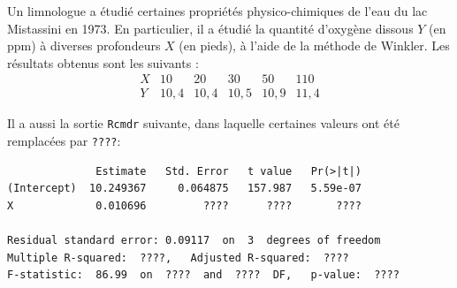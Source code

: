 \begin{questions}
\newpage 
\question 
Un limnologue a étudié certaines propriétés physico-chimiques de l'eau du lac Mistassini en 1973. En particulier, il a étudié la quantité d'oxygène dissous $Y$ (en ppm) à diverses profondeurs $X$ (en pieds), à l'aide de la méthode de Winkler. Les résultats obtenus sont les suivants :
$$
\begin{array}{c|ccccc}
X & 10 & 20 & 30 & 50 & 110   \\  \hline
Y & 10,4 & 10,4 & 10,5 & 10,9 & 11,4
\end{array}
$$

Il a aussi la sortie \texttt{Rcmdr} suivante, dans laquelle certaines valeurs ont été remplacées par \texttt{????}:
\begin{verbatim}
              Estimate   Std. Error   t value   Pr(>|t|)    
(Intercept)  10.249367     0.064875   157.987   5.59e-07 
X             0.010696         ????      ????       ????   

Residual standard error: 0.09117  on  3  degrees of freedom
Multiple R-squared:  ????,	 Adjusted R-squared:  ???? 
F-statistic:  86.99  on  ????  and  ????  DF,   p-value:  ????
\end{verbatim}


\end{questions}
